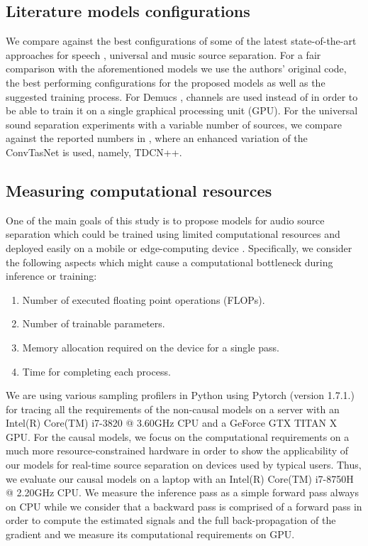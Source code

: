 \subsection{Literature models configurations}
\label{sec:exp_setup:literature}
We compare against the best configurations of some of the latest state-of-the-art approaches for speech \cite{luo2019convTasNet,luo2019dual}, universal \cite{tzinis2019two} and music \cite{defossez2019demucs} source separation. For a fair comparison with the aforementioned models we use the authors' original code, the best performing configurations for the proposed models as well as the suggested training process. For Demucs \cite{defossez2019demucs},  channels are used instead of  in order to be able to train it on a single graphical processing unit (GPU). For the universal sound separation experiments with a variable number of sources, we compare against the reported numbers in \cite{wisdom2020FUSS}, where an enhanced variation of the ConvTasNet is used, namely, TDCN++.

\subsection{Measuring computational resources}
\label{sec:exp_setup:computational_resources}
One of the main goals of this study is to propose models for audio source separation which could be trained using limited computational resources and deployed easily on a mobile or edge-computing device  \cite{lane2016deepx_deeplearning_onmobiledevs}. Specifically, we consider the following aspects which might cause a computational bottleneck during inference or training:
\begin{enumerate}
    \item Number of executed floating point operations (FLOPs).
     \item Number of trainable parameters.
    \item Memory allocation required on the device for a single pass.
    \item Time for completing each process. 
\end{enumerate}
We are using various sampling profilers in Python using Pytorch \cite{pytorch} (version 1.7.1.) for tracing all the requirements of the non-causal models on a server with an Intel(R) Core(TM) i7-3820 @ 3.60GHz CPU and a GeForce GTX TITAN X GPU. For the causal models, we focus on the computational requirements on a much more resource-constrained hardware in order to show the applicability of our models for real-time source separation on devices used by typical users. Thus, we evaluate our causal models on a laptop with an Intel(R) Core(TM) i7-8750H @ 2.20GHz CPU. We measure the inference pass as a simple forward pass always on CPU while we consider that a backward pass is comprised of a forward pass in order to compute the estimated signals and the full back-propagation of the gradient and we measure its computational requirements on GPU.

